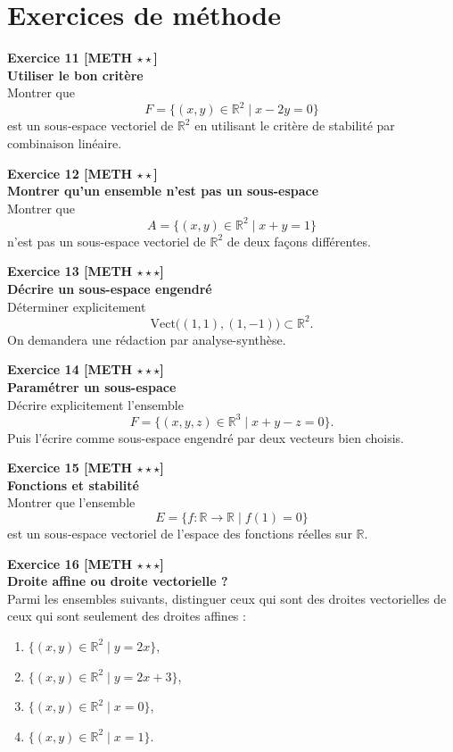 \documentclass[11pt,a4paper]{article}
\begin{document}
\newpage

\section*{Exercices de méthode}

\textbf{Exercice 11 [METH $\star\star$]}\\
\textbf{Utiliser le bon critère}\\
Montrer que
\[
F=\{(x,y)\in\mathbb{R}^2\mid x-2y=0\}
\]
est un sous-espace vectoriel de $\mathbb{R}^2$ en utilisant le critère de stabilité par combinaison linéaire.

\textbf{Exercice 12 [METH $\star\star$]}\\
\textbf{Montrer qu’un ensemble n’est pas un sous-espace}\\
Montrer que
\[
A=\{(x,y)\in\mathbb{R}^2\mid x+y=1\}
\]
n’est pas un sous-espace vectoriel de $\mathbb{R}^2$ de deux façons différentes.

\textbf{Exercice 13 [METH $\star\star\star$]}\\
\textbf{Décrire un sous-espace engendré}\\
Déterminer explicitement
\[
\mathrm{Vect}\big((1,1),(1,-1)\big)\subset \mathbb{R}^2.
\]
On demandera une rédaction par analyse-synthèse.

\textbf{Exercice 14 [METH $\star\star\star$]}\\
\textbf{Paramétrer un sous-espace}\\
Décrire explicitement l’ensemble
\[
F=\{(x,y,z)\in\mathbb{R}^3\mid x+y-z=0\}.
\]
Puis l’écrire comme sous-espace engendré par deux vecteurs bien choisis.

\textbf{Exercice 15 [METH $\star\star\star$]}\\
\textbf{Fonctions et stabilité}\\
Montrer que l’ensemble
\[
E=\{f:\mathbb{R}\to\mathbb{R}\mid f(1)=0\}
\]
est un sous-espace vectoriel de l’espace des fonctions réelles sur $\mathbb{R}$.

\textbf{Exercice 16 [METH $\star\star\star$]}\\
\textbf{Droite affine ou droite vectorielle ?}\\
Parmi les ensembles suivants, distinguer ceux qui sont des droites vectorielles de ceux qui sont seulement des droites affines :
\begin{enumerate}[label=\alph*)]
    \item $\{(x,y)\in\mathbb{R}^2\mid y=2x\}$,
    \item $\{(x,y)\in\mathbb{R}^2\mid y=2x+3\}$,
    \item $\{(x,y)\in\mathbb{R}^2\mid x=0\}$,
    \item $\{(x,y)\in\mathbb{R}^2\mid x=1\}$.
\end{enumerate}
\end{document}
